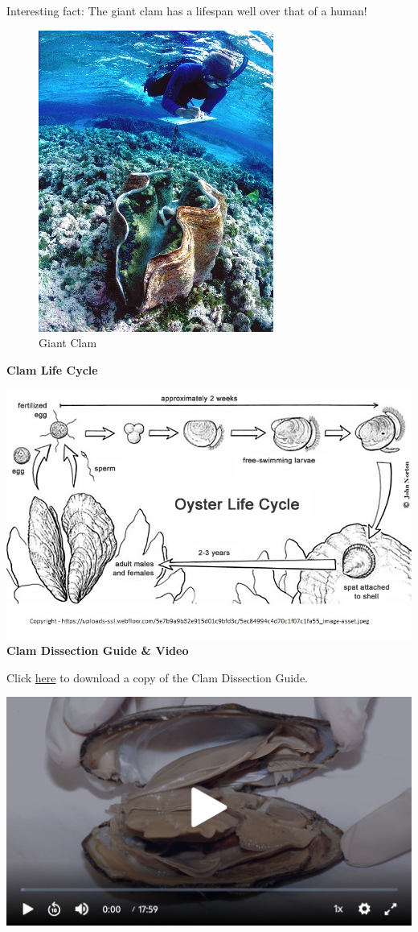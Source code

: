 \documentclass[
]{book}
\begin{document}
Interesting fact: The giant clam has a lifespan well over that of a human!

\begin{figure}
\centering
\includegraphics{images/Lab4_giant_clam.png}
\caption{Giant Clam}
\end{figure}

\textbf{Clam Life Cycle}

\includegraphics{images/Lab4_clam_life_cycle.png}
\textbf{Clam Dissection Guide \& Video}

Click \href{files/Lab4_clam_dissection_guide.pdf}{here} to download a copy of the Clam Dissection Guide.

\includegraphics{images/Lab4_Clam_Dissection_Video.png}
\end{document}
